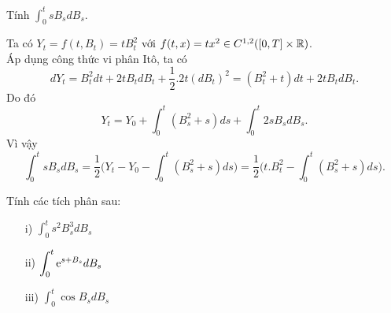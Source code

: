 \begin{exam*}
Tính $\displaystyle \int_0^tsB_sdB_s$.
\begin{sol*}
    Ta có $Y_t = f(t,B_t) = tB_t^2$ với $f(t, x)= tx^2 \in C^{1,2}([0,T]\times \mathbb{R})$.\\ Áp dụng công thức vi phân Itô, ta có 
    \[dY_t=B_t^2dt + 2tB_tdB_t + \dfrac{1}{2}.2t(dB_t)^2 = (B_t^2 +t)dt + 2tB_tdB_t.\] 
    Do đó 
    \[Y_t = Y_0 + \displaystyle \int_0^t(B_s^2 +s)ds + \displaystyle \int_0^t2sB_sdB_s.\]
    Vì vậy
    \[\displaystyle \int_0^tsB_sdB_s 
    = \dfrac{1}{2}\bigg(Y_t - Y_0 - \displaystyle \int_0^t(B_s^2+s)ds\bigg) 
    = \dfrac{1}{2}\bigg(t.B_t^2 - \displaystyle \int_0^t(B_s^2+s)ds\bigg).\]
\end{sol*}
\end{exam*}
\begin{exam*}
Tính các tích phân sau:
\begin{itemize}
    \item[i)] $\displaystyle \int_0^t s^2 B_s^3 dB_s $
    \item[ii)] $\displaystyle \int_0^t \mathrm{e}^{s+B_s} dB_s $
    \item[iii)] $\displaystyle \int_0^t \cos B_s dB_s $
\end{itemize}
\end{exam*}
